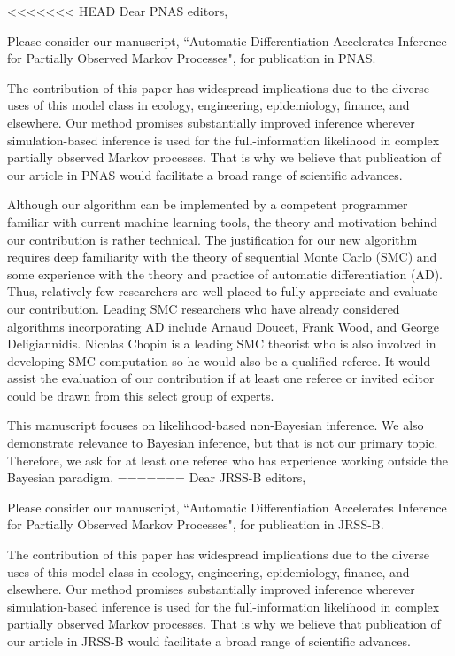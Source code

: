 \documentclass[11pt]{article}
\begin{document}
<<<<<<< HEAD
\noindent Dear PNAS editors,
\newline

Please consider our manuscript, ``Automatic Differentiation Accelerates Inference for Partially Observed Markov Processes", for publication in PNAS.

The contribution of this paper has widespread implications due to the diverse uses of this model class in ecology, engineering, epidemiology, finance, and elsewhere. Our method promises substantially improved inference wherever simulation-based inference is used for the full-information likelihood in complex partially observed Markov processes. That is why we believe that publication of our article in PNAS would facilitate a broad range of scientific advances. 

Although our algorithm can be implemented by a competent programmer familiar with current machine learning tools, the theory and motivation behind our contribution is rather technical. The justification for our new algorithm requires deep familiarity with the theory of sequential Monte Carlo (SMC) and some experience with the theory and practice of automatic differentiation (AD). Thus, relatively few researchers are well placed to fully appreciate and evaluate our contribution. Leading SMC researchers who have already considered algorithms incorporating AD include Arnaud Doucet, Frank Wood, and George Deligiannidis. Nicolas Chopin is a leading SMC theorist who is also involved in developing SMC computation so he would also be a qualified referee. It would assist the evaluation of our contribution if at least one referee or invited editor could be drawn from this select group of experts.

This manuscript focuses on likelihood-based non-Bayesian inference. We also demonstrate relevance to Bayesian inference, but that is not our primary topic. Therefore, we ask for at least one referee who has experience working outside the Bayesian paradigm.
=======
\noindent Dear JRSS-B editors,
\newline

Please consider our manuscript, ``Automatic Differentiation Accelerates Inference for Partially Observed Markov Processes", for publication in JRSS-B.

The contribution of this paper has widespread implications due to the diverse uses of this model class in ecology, engineering, epidemiology, finance, and elsewhere. Our method promises substantially improved inference wherever simulation-based inference is used for the full-information likelihood in complex partially observed Markov processes. That is why we believe that publication of our article in JRSS-B would facilitate a broad range of scientific advances. 
\end{document}
